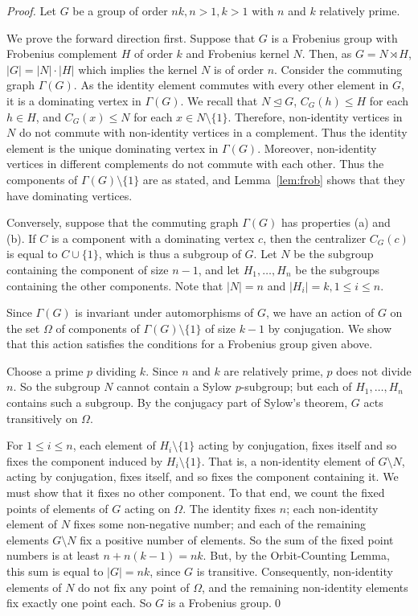 \documentclass{elsarticle}
\begin{document}
\begin{proof}
  Let $G$ be a group of order $nk, n>1, k>1$ with $n$ and $k$
  relatively prime.

  We prove the forward direction first. Suppose that $G$ is a
  Frobenius group with Frobenius complement $H$ of order $k$ and
  Frobenius kernel $N$. Then, as $G=N\rtimes H$, $|G|=|N|\cdot |H|$
  which implies the kernel $N$ is of order $n$.  Consider the
  commuting graph $\Gamma(G)$. As the identity element commutes with
  every other element in $G$, it is a dominating vertex in
  $\Gamma(G)$.  We recall \cite[35.24~and~35.25]{Asch86} that
  $N \trianglelefteq G$, $C_G(h)\le H$ for each $h \in H$, and
  $C_G(x)\le N$ for each $x \in N\setminus \{1\}$. Therefore,
  non-identity vertices in $N$ do not commute with non-identity
  vertices in a complement. Thus the identity element is the unique
  dominating vertex in $\Gamma(G)$.  Moreover, non-identity vertices
  in different complements do not commute with each other. Thus the
  components of $\Gamma(G)\setminus\{1\}$ are as stated, and
  Lemma~\ref{lem:frob} shows that they have dominating vertices.

Conversely, suppose that the commuting graph $\Gamma(G)$ has
properties (a) and (b). If $C$ is a component with a dominating vertex
$c$, then the centralizer $C_G(c)$ is equal to $C\cup\{1\}$, which is
thus a subgroup of $G$.  Let $N$ be the subgroup containing the
component of size $n-1$, and let $H_1,\ldots,H_n$ be the subgroups
containing the other components. Note that $|N|=n$ and $|H_i|=k, 1\le
i\le n$.

Since $\Gamma(G)$ is invariant under automorphisms of $G$, we have an
action of $G$ on the set $\Omega$ of components of
$\Gamma(G)\setminus\{1\}$ of size $k-1$ by conjugation. We show that
this action satisfies the conditions for a Frobenius group given
above.

Choose a prime $p$ dividing $k$. Since $n$ and $k$ are relatively
prime, $p$ does not divide $n$. So the subgroup $N$ cannot contain a
Sylow $p$-subgroup; but each of $H_1,\ldots,H_n$ contains such a
subgroup. By the conjugacy part of Sylow's theorem, $G$ acts
transitively on $\Omega$.

For $1\le i\le n$, each element of $H_i\setminus\{1\}$ acting by
conjugation, fixes itself and so fixes the component induced by
$H_i\setminus\{1\}$. That is, a non-identity element of
$G\setminus N$, acting by conjugation, fixes itself, and so fixes the
component containing it. We must show that it fixes no other
component. To that end, we count the fixed points of elements of $G$
acting on $\Omega$. The identity fixes $n$; each non-identity element
of $N$ fixes some non-negative number; and each of the remaining
elements $G\setminus N$ fix a positive number of elements. So the sum
of the fixed point numbers is at least $n+n(k-1)=nk$. But, by the
Orbit-Counting Lemma, this sum is equal to $|G|=nk$, since $G$ is
transitive. Consequently, non-identity elements of $N$ do not fix any
point of $\Omega$, and the remaining non-identity elements fix exactly
one point each. So $G$ is a Frobenius group.\qed
\end{proof}
\end{document}
